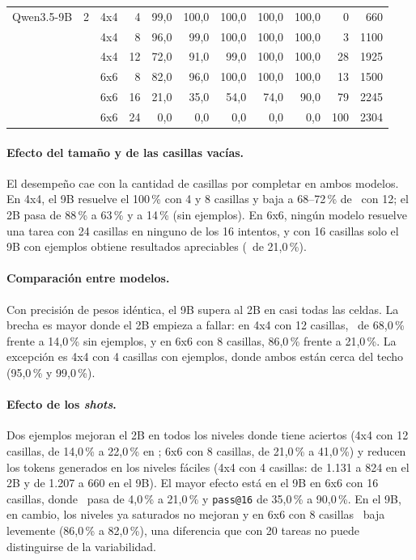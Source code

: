 \begin{table}[htbp]
\begin{tabular}{@{}llcrrrrrrrr@{}}
    \midrule
    Qwen3.5-9B & 2 & 4x4 & 4 & 99,0 & 100,0 & 100,0 & 100,0 & 100,0 & 0 & 660 \\
     &  & 4x4 & 8 & 96,0 & 99,0 & 100,0 & 100,0 & 100,0 & 3 & 1100 \\
     &  & 4x4 & 12 & 72,0 & 91,0 & 99,0 & 100,0 & 100,0 & 28 & 1925 \\
     &  & 6x6 & 8 & 82,0 & 96,0 & 100,0 & 100,0 & 100,0 & 13 & 1500 \\
     &  & 6x6 & 16 & 21,0 & 35,0 & 54,0 & 74,0 & 90,0 & 79 & 2245 \\
     &  & 6x6 & 24 & 0,0 & 0,0 & 0,0 & 0,0 & 0,0 & 100 & 2304 \\
    \bottomrule
  \end{tabular}
\end{table}

\paragraph{Efecto del tamaño y de las casillas vacías.}
El desempeño cae con la cantidad de casillas por completar en ambos modelos.
En 4x4, el 9B resuelve el 100\,\% con 4 y 8 casillas y baja a 68--72\,\% de
\passuno\ con 12; el 2B pasa de 88\,\% a 63\,\% y a 14\,\% (sin ejemplos). En
6x6, ningún modelo resuelve una tarea con 24 casillas en ninguno de los 16
intentos, y con 16 casillas solo el 9B con ejemplos obtiene resultados
apreciables (\passuno\ de 21,0\,\%).

\paragraph{Comparación entre modelos.}
Con precisión de pesos idéntica, el 9B supera al 2B en casi todas las
celdas. La brecha es mayor donde el 2B empieza a fallar: en 4x4 con 12
casillas, \passuno\ de 68,0\,\% frente a 14,0\,\% sin ejemplos, y en 6x6 con
8 casillas, 86,0\,\% frente a 21,0\,\%. La excepción es 4x4 con 4 casillas
con ejemplos, donde ambos están cerca del techo (95,0\,\% y 99,0\,\%).

\paragraph{Efecto de los \emph{shots}.}
Dos ejemplos mejoran el 2B en todos los niveles donde tiene aciertos
(4x4 con 12 casillas, de 14,0\,\% a 22,0\,\% en \passuno; 6x6 con 8
casillas, de 21,0\,\% a 41,0\,\%) y reducen los tokens generados en los
niveles fáciles (4x4 con 4 casillas: de 1.131 a 824 en el 2B y de 1.207 a
660 en el 9B). El mayor efecto está en el 9B en 6x6 con 16 casillas, donde
\passuno\ pasa de 4,0\,\% a 21,0\,\% y \texttt{pass@16} de 35,0\,\% a
90,0\,\%. En el 9B, en cambio, los niveles ya saturados no mejoran y en 6x6
con 8 casillas \passuno\ baja levemente (86,0\,\% a 82,0\,\%), una
diferencia que con 20 tareas no puede distinguirse de la variabilidad.

